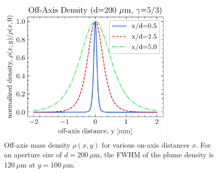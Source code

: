\begin{figure}
	\centering
	\includegraphics[width=0.75\textwidth]{figures/chap3/off_axis_density.pdf}
	\caption{Off-axis mass density $\rho(x,y)$ for various on-axis distances $x$. For an aperture size of $d = 200 \ \mu$m, the FWHM of the plume density is $120 \ \mu$m at $y = 100 \ \mu$m.}
	\label{fig:off_axis_density}
\end{figure}

%

